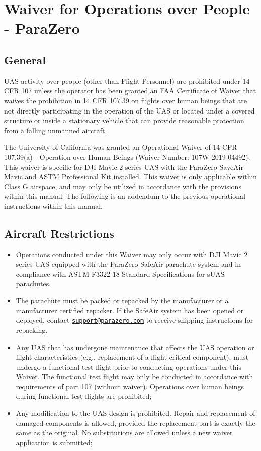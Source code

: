 \documentclass[
]{book}
\providecommand{\tightlist}{%
  \setlength{\itemsep}{0pt}\setlength{\parskip}{0pt}}
\begin{document}
\hypertarget{ch-part39-parazero}{%
\chapter{Waiver for Operations over People - ParaZero}\label{ch-part39-parazero}}

\hypertarget{s39p-gen}{%
\section{General}\label{s39p-gen}}

UAS activity over people (other than Flight Personnel) are prohibited under 14 CFR 107 unless the operator has been granted an FAA Certificate of Waiver that waives the prohibition in 14 CFR 107.39 on flights over human beings that are not directly participating in the operation of the UAS or located under a covered structure or inside a stationary vehicle that can provide reasonable protection from a falling unmanned aircraft.

The University of California was granted an Operational Waiver of 14 CFR 107.39(a) - Operation over Human Beings (Waiver Number: 107W-2019-04492). This waiver is specific for DJI Mavic 2 series UAS with the ParaZero SaveAir Mavic and ASTM Professional Kit installed. This waiver is only applicable within Class G airspace, and may only be utilized in accordance with the provisions within this manual. The following is an addendum to the previous operational instructions within this manual.

\hypertarget{s39p-ar}{%
\section{Aircraft Restrictions}\label{s39p-ar}}

\begin{itemize}
\tightlist
\item
  Operations conducted under this Waiver may only occur with DJI Mavic 2 series UAS equipped with the ParaZero SafeAir parachute system and in compliance with ASTM F3322-18 Standard Specifications for sUAS parachutes.
\item
  The parachute must be packed or repacked by the manufacturer or a manufacturer certified repacker. If the SafeAir system has been opened or deployed, contact \href{mailto:support@parazero.com}{\nolinkurl{support@parazero.com}} to receive shipping instructions for repacking.
\item
  Any UAS that has undergone maintenance that affects the UAS operation or flight characteristics (e.g., replacement of a flight critical component), must undergo a functional test flight prior to conducting operations under this Waiver. The functional test flight may only be conducted in accordance with requirements of part 107 (without waiver). Operations over human beings during functional test flights are prohibited;
\item
  Any modification to the UAS design is prohibited. Repair and replacement of damaged components is allowed, provided the replacement part is exactly the same as the original. No substitutions are allowed unless a new waiver application is submitted;
\end{itemize}
\end{document}
